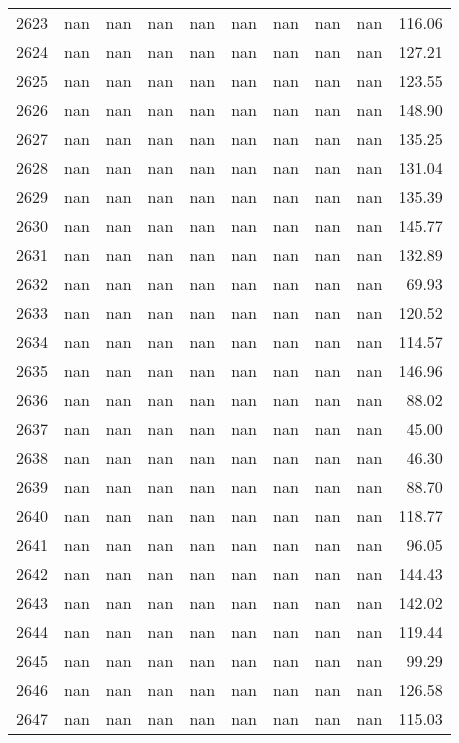 \begin{tabular}{lrrrrrrrrr}
2623 & nan & nan & nan & nan & nan & nan & nan & nan & 116.06 \\
2624 & nan & nan & nan & nan & nan & nan & nan & nan & 127.21 \\
2625 & nan & nan & nan & nan & nan & nan & nan & nan & 123.55 \\
2626 & nan & nan & nan & nan & nan & nan & nan & nan & 148.90 \\
2627 & nan & nan & nan & nan & nan & nan & nan & nan & 135.25 \\
2628 & nan & nan & nan & nan & nan & nan & nan & nan & 131.04 \\
2629 & nan & nan & nan & nan & nan & nan & nan & nan & 135.39 \\
2630 & nan & nan & nan & nan & nan & nan & nan & nan & 145.77 \\
2631 & nan & nan & nan & nan & nan & nan & nan & nan & 132.89 \\
2632 & nan & nan & nan & nan & nan & nan & nan & nan & 69.93 \\
2633 & nan & nan & nan & nan & nan & nan & nan & nan & 120.52 \\
2634 & nan & nan & nan & nan & nan & nan & nan & nan & 114.57 \\
2635 & nan & nan & nan & nan & nan & nan & nan & nan & 146.96 \\
2636 & nan & nan & nan & nan & nan & nan & nan & nan & 88.02 \\
2637 & nan & nan & nan & nan & nan & nan & nan & nan & 45.00 \\
2638 & nan & nan & nan & nan & nan & nan & nan & nan & 46.30 \\
2639 & nan & nan & nan & nan & nan & nan & nan & nan & 88.70 \\
2640 & nan & nan & nan & nan & nan & nan & nan & nan & 118.77 \\
2641 & nan & nan & nan & nan & nan & nan & nan & nan & 96.05 \\
2642 & nan & nan & nan & nan & nan & nan & nan & nan & 144.43 \\
2643 & nan & nan & nan & nan & nan & nan & nan & nan & 142.02 \\
2644 & nan & nan & nan & nan & nan & nan & nan & nan & 119.44 \\
2645 & nan & nan & nan & nan & nan & nan & nan & nan & 99.29 \\
2646 & nan & nan & nan & nan & nan & nan & nan & nan & 126.58 \\
2647 & nan & nan & nan & nan & nan & nan & nan & nan & 115.03 \\

\end{tabular}
